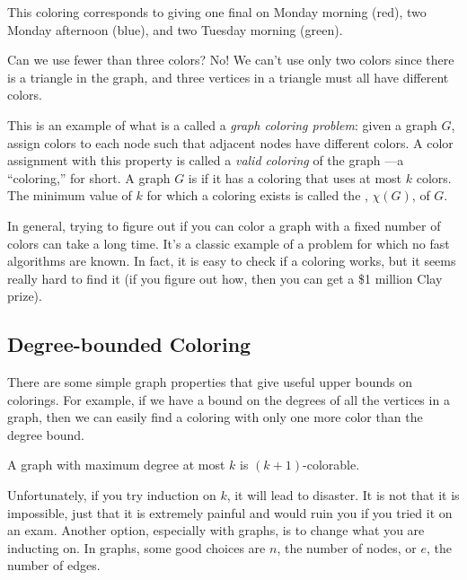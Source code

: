 
This coloring corresponds to giving one final on Monday morning (red),
two Monday afternoon (blue), and two Tuesday morning (green).

Can we use fewer than three colors?  No! We can't use only two colors
since there is a triangle in the graph, and three vertices in a triangle
must all have different colors.

This is an example of what is a called a \emph{graph coloring problem}:
given a graph $G$, assign colors to each node such that adjacent nodes
have different colors.  A color assignment with this property is called a
\emph{valid coloring} of the graph ---a ``coloring,'' for short.  A graph
$G$ is  if it has a coloring that uses at most $k$
colors.  The minimum value of $k$ for which a coloring exists is called
the , $\chi(G)$, of $G$.

In general, trying to figure out if you can color a graph with a fixed
number of colors can take a long time.  It's a classic example of a
problem for which no fast algorithms are known.  In fact, it is easy to
check if a coloring works, but it seems really hard to find it (if you
figure out how, then you can get a \$1 million Clay prize).

\subsection{Degree-bounded Coloring}

There are some simple graph properties that give useful upper bounds on
colorings.  For example, if we have a bound on the degrees of all the
vertices in a graph, then we can easily find a coloring with only one more
color than the degree bound.

\begin{theorem}\label{k+1-colorable}
A graph with maximum degree at most $k$ is $(k+1)$-colorable.
\end{theorem}

Unfortunately, if you try induction on $k$, it will lead to disaster.  It
is not that it is impossible, just that it is extremely painful and would
ruin you if you tried it on an exam.  Another option, especially with
graphs, is to change what you are inducting on.  In graphs, some good
choices are $n$, the number of nodes, or $e$, the number of edges.

